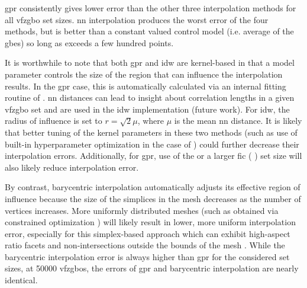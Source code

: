 \documentclass[final,twocolumn,12pt]{elsarticle}
\begin{document}
\Gls{gpr} consistently gives lower error than the other three interpolation methods for all \gls{vfzgbo} set sizes. 
\Gls{nn} interpolation produces the worst error of the four methods, but is better than a constant valued control model (i.e. average of the \inpt{} \glspl{gbe}) so long as  exceeds a few hundred \inpt{} points.

It is worthwhile to note that both \gls{gpr} and \gls{idw} are kernel-based in that a model parameter controls the size of the region that can influence the interpolation results. In the \gls{gpr} case, this is automatically calculated via an internal fitting routine of . \gls{nn} distances can lead to insight about correlation lengths in a given \gls{vfzgbo} set and are used in the \gls{idw} implementation (future work). For \gls{idw}, the radius of influence is set to $r=\sqrt{2} \mu$, where $\mu$ is the mean \gls{nn} distance. It is likely that better tuning of the kernel parameters in these two methods (such as use of built-in hyperparameter optimization in the case of ) could further decrease their interpolation errors. Additionally, for \gls{gpr}, use of the   or a larger \gls{fic} ( ) set size will also likely reduce interpolation error.

By contrast, barycentric interpolation automatically adjusts its effective region of influence because the size of the simplices in the mesh decreases as the number of vertices increases. More uniformly distributed meshes (such as obtained via constrained optimization \cite{dolanBenchmarkingOptimizationSoftware2004,ConstrainedElectrostaticNonlinear2020}) will likely result in lower, more uniform interpolation error, especially for this simplex-based approach which can exhibit high-aspect ratio facets and non-intersections outside the bounds of the mesh \cite{bairdBarycentricInterpolation7SphereUnderReview}.  %
While the barycentric interpolation error is always higher than \gls{gpr} for the considered set sizes, at \num{50000} \glspl{vfzgbo}, the errors of \gls{gpr} and barycentric interpolation are nearly identical.
\end{document}
